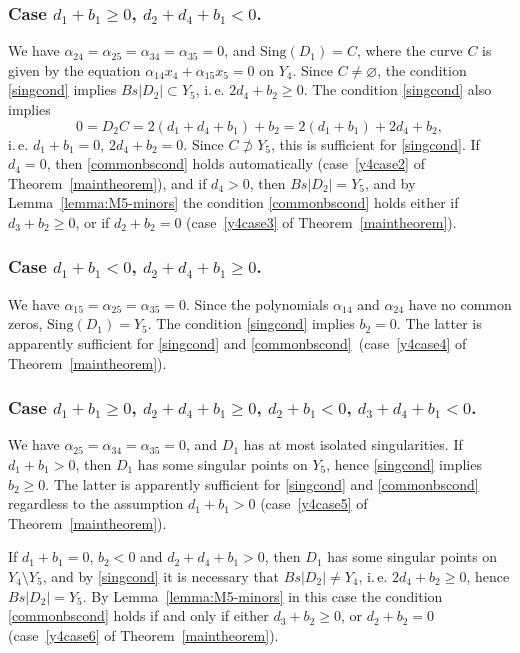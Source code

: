 \documentclass[12pt]{amsart}
\theoremstyle{definition}
\theoremstyle{remark}
\begin{document}
\subsubsection{Case $d_1+b_1\geqslant 0$, $d_2+d_4+b_1<0$.} 
We have $\alpha_{24}=\alpha_{25}=\alpha_{34}=\alpha_{35}=0$, 
and ${\mathrm{Sing}}(D_1)=C$, where the curve $C$ is given by the equation 
$\alpha_{14}x_4+\alpha_{15}x_5=0$ on $Y_4$. Since $C\neq\varnothing$, 
the condition \ref{singcond} implies $Bs|D_2|\subset Y_5$, i.\,e.
$2d_4+b_2\geqslant 0$. The condition \ref{singcond} also implies 
$$0=D_2C=2(d_1+d_4+b_1)+b_2=2(d_1+b_1)+2d_4+b_2,$$ 
i.\,e. $d_1+b_1=0$, $2d_4+b_2=0$. Since $C\not\supset Y_5$, this is sufficient
for \ref{singcond}. If $d_4=0$, then \ref{commonbscond} holds automatically
(case~\ref{y4case2} of Theorem~\ref{maintheorem}), 
and if $d_4>0$, then $Bs|D_2|=Y_5$, 
and by Lemma~\ref{lemma:M5-minors} the condition \ref{commonbscond} 
holds either if $d_3+b_2\geqslant 0$, or if $d_2+b_2=0$ 
(case~\ref{y4case3} of Theorem~\ref{maintheorem}). 

\subsubsection{Case $d_1+b_1<0$, $d_2+d_4+b_1\geqslant 0$.} 
We have $\alpha_{15}=\alpha_{25}=\alpha_{35}=0$. Since the polynomials 
$\alpha_{14}$ and $\alpha_{24}$ have no common zeros,  
${\mathrm{Sing}}(D_1)=Y_5$. 
The condition \ref{singcond} implies $b_2=0$.
The latter is apparently sufficient for \ref{singcond} and \ref{commonbscond}\
(case~\ref{y4case4} of Theorem~\ref{maintheorem}). 

\subsubsection{Case $d_1+b_1\geqslant 0$, $d_2+d_4+b_1\geqslant 0$, 
$d_2+b_1<0$, $d_3+d_4+b_1<0$.}
We have $\alpha_{25}=\alpha_{34}=\alpha_{35}=0$, and $D_1$ has at most isolated 
singularities. If $d_1+b_1>0$, then $D_1$ has some singular points 
on $Y_5$, hence \ref{singcond} implies $b_2\geqslant 0$.
The latter is apparently sufficient for \ref{singcond} and \ref{commonbscond} 
regardless to the assumption $d_1+b_1>0$
(case~\ref{y4case5} of Theorem~\ref{maintheorem}). 

If $d_1+b_1=0$, $b_2<0$ and $d_2+d_4+b_1>0$, then $D_1$ has some singular 
points on
$Y_4\setminus Y_5$, and by \ref{singcond} it is necessary that 
$Bs|D_2|\neq Y_4$,
i.\,e. $2d_4+b_2\geqslant 0$, hence $Bs|D_2|=Y_5$. 
By Lemma~\ref{lemma:M5-minors} in this case the condition \ref{commonbscond} 
holds if and only if either $d_3+b_2\geqslant 0$, or $d_2+b_2=0$
(case~\ref{y4case6} of Theorem~\ref{maintheorem}). 
\end{document}
